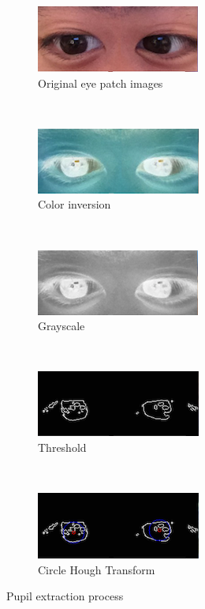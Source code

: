 \documentclass[10pt,twocolumn,letterpaper]{article}
\begin{document}
\begin{figure}[H]
    \centering
    \begin{subfigure}[t]{0.5\linewidth}
        \centering
        \includegraphics[scale=0.5]{original}
        \caption{Original eye patch images}
    \end{subfigure}%
    ~ 
    \begin{subfigure}[t]{0.5\linewidth}
        \centering
        \includegraphics[scale=0.5]{invert}
        \caption{Color inversion}
    \end{subfigure}
    ~ 
    \begin{subfigure}[t]{0.5\linewidth}
        \centering
        \includegraphics[scale=0.5]{gray}
        \caption{Grayscale}
    \end{subfigure}%
    ~ 
    \begin{subfigure}[t]{0.5\linewidth}
        \centering
        \includegraphics[scale=0.5]{threshold}
        \caption{Threshold}
    \end{subfigure}
    ~ 
    \begin{subfigure}[t]{0.5\linewidth}
        \centering
        \includegraphics[scale=0.5]{final}
        \caption{Circle Hough Transform}
    \end{subfigure}
    \caption{Pupil extraction process}
    \label{pupil}
\end{figure}
\end{document}
